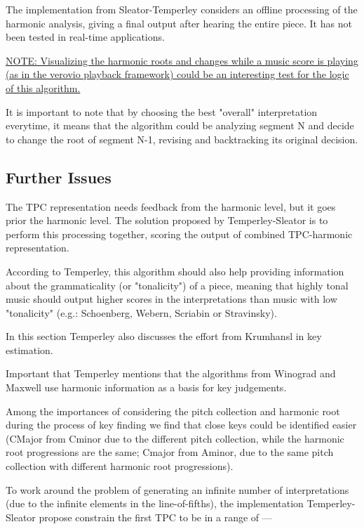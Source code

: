 		The implementation from Sleator-Temperley considers an offline processing of the harmonic analysis, giving a final output after hearing the entire piece. It has not been tested in real-time applications.

		\underline{NOTE: Visualizing the harmonic roots and changes while a music score is playing (as in the verovio playback framework) could be an interesting test for the logic of this algorithm.}

		It is important to note that by choosing the best "overall" interpretation everytime, it means that the algorithm could be analyzing segment N and decide to change the root of segment N-1, revising and backtracking its original decision.


		\subsection{Further Issues}

		The TPC representation needs feedback from the harmonic level, but it goes prior the harmonic level. The solution proposed by Temperley-Sleator is to perform this processing together, scoring the output of combined TPC-harmonic representation.

		According to Temperley, this algorithm should also help providing information about the grammaticality (or "tonalicity") of a piece, meaning that highly tonal music should output higher scores in the interpretations than music with low "tonalicity" (e.g.: Schoenberg, Webern, Scriabin or Stravinsky).

		In this section Temperley also discusses the effort from Krumhansl in key estimation.

		Important that Temperley mentions that the algorithms from Winograd and Maxwell use harmonic information as a basis for key judgements.

		Among the importances of considering the pitch collection and harmonic root during the process of key finding we find that close keys could be identified easier (CMajor from Cminor due to the different pitch collection, while the harmonic root progressions are the same; Cmajor from Aminor, due to the same pitch collection with different harmonic root progressions).

		To work around the problem of generating an infinite number of interpretations (due to the infinite elements in the line-of-fifths), the implementation Temperley-Sleator propose constrain the first TPC to be in a range of ---

